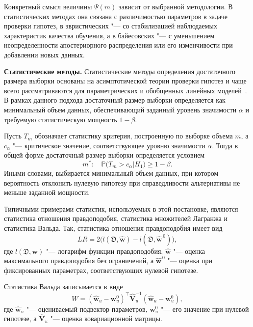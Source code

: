 Конкретный смысл величины $\Psi(m)$ зависит от выбранной методологии. В статистических методах она связана с различимостью параметров в задаче проверки гипотез, в эвристических "--- со стабилизацией наблюдаемых характеристик качества обучения, а в байесовских "--- с уменьшением неопределенности апостериорного распределения или его изменчивости при добавлении новых данных.

\textbf{Статистические методы.} Статистические методы определения достаточного размера выборки основаны на асимптотической теории проверки гипотез и чаще всего рассматриваются для параметрических и обобщенных линейных моделей~\cite{self1988,self1992,shieh2000,shieh2005,demidenko2007}. В рамках данного подхода достаточный размер выборки определяется как минимальный объем данных, обеспечивающий заданный уровень значимости $\alpha$ и требуемую статистическую мощность $1-\beta$.

Пусть $T_m$ обозначает статистику критерия, построенную по выборке объема $m$, а $c_\alpha$ "--- критическое значение, соответствующее уровню значимости $\alpha$. Тогда в общей форме достаточный размер выборки определяется условием
\begin{equation}
    \label{eq:review-stat-general}
    m^*:\quad \mathbb P\bigl(T_m>c_\alpha | H_1\bigr)\ge 1-\beta.
\end{equation}
Иными словами, выбирается минимальный объем данных, при котором вероятность отклонить нулевую гипотезу при справедливости альтернативы не меньше заданной мощности.

Типичными примерами статистик, используемых в этой постановке, являются статистика отношения правдоподобия, статистика множителей Лагранжа и статистика Вальда. Так, статистика отношения правдоподобия имеет вид
\begin{equation}
    \label{eq:review-lr}
    LR
    =
    2\bigl(
        l(\mathfrak D, \hat{\mathbf w})
        -
        l(\mathfrak D, \hat{\mathbf w}^{\,0})
    \bigr),
\end{equation}
где $l(\mathfrak D, \mathbf w)$ "--- логарифм функции правдоподобия, $\hat{\mathbf w}$ "--- оценка максимального правдоподобия без ограничений, а $\hat{\mathbf w}^{\,0}$ "--- оценка при фиксированных параметрах, соответствующих нулевой гипотезе.

Статистика Вальда записывается в виде
\begin{equation}
    \label{eq:review-wald}
    W
    =
    (\hat{\mathbf w}_u-\mathbf w_u^0)^\top
    \hat{\mathbf V}_u^{-1}
    (\hat{\mathbf w}_u-\mathbf w_u^0),
\end{equation}
где $\hat{\mathbf w}_u$ "--- оцениваемый подвектор параметров, $\mathbf w_u^0$ "--- его значение при нулевой гипотезе, а $\hat{\mathbf V}_u$ "--- оценка ковариационной матрицы.

